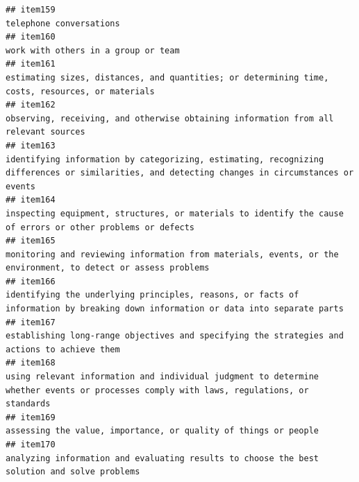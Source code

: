 \documentclass[
  man]{apa6}
\begin{document}
\begin{verbatim}
## item159                                                                                                                                                                                                   telephone conversations
## item160                                                                                                                                                                                       work with others in a group or team
## item161                                                                                                                          estimating sizes, distances, and quantities; or determining time, costs, resources, or materials
## item162                                                                                                                                       observing, receiving, and otherwise obtaining information from all relevant sources
## item163                                                                            identifying information by categorizing, estimating, recognizing differences or similarities, and detecting changes in circumstances or events
## item164                                                                                                               inspecting equipment, structures, or materials to identify the cause of errors or other problems or defects
## item165                                                                                                             monitoring and reviewing information from materials, events, or the environment, to detect or assess problems
## item166                                                                                          identifying the underlying principles, reasons, or facts of information by breaking down information or data into separate parts
## item167                                                                                                                              establishing long-range objectives and specifying the strategies and actions to achieve them
## item168                                                                                   using relevant information and individual judgment to determine whether events or processes comply with laws, regulations, or standards
## item169                                                                                                                                                           assessing the value, importance, or quality of things or people
## item170                                                                                                                               analyzing information and evaluating results to choose the best solution and solve problems

\end{verbatim}
\end{document}
